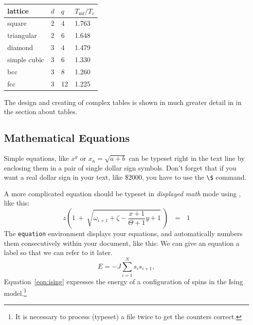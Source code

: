 \begin{table}[ht]
\centering
\small\renewcommand{\arraystretch}{1.4}  
%
\label{tab:IsingModel}
%
\begin{tabularx}{0.5\textwidth}{lXXX}
\hline
\rowcolor{tableheadcolor}
lattice & $d$ & $q$ & $T_\text{mf}/T_c$ \\
\hline
square  & 2 & 4 & 1.763 \\
%
triangular & 2 & 6 & 1.648 \\
%
diamond & 3 & 4 & 1.479 \\
%
simple cubic & 3 & 6 & 1.330 \\
%
bcc & 3 & 8 & 1.260 \\
%
fcc & 3 & 12 & 1.225 \\
\hline
\end{tabularx}
\end{table}

The design and creating of complex tables is shown in much greater detail in  in the section about tables.

\subsection{Mathematical Equations}
\label{sec:example:math}

Simple equations, like $x^y$ or $x_n = \sqrt{a + b}$ can be typeset right
in the text line by enclosing them in a pair of single dollar sign symbols.
Don't forget that if you want a real dollar sign in your text, like \$2000,
you have to use the \verb+\$+ command.

A more complicated equation should be typeset in \emph{displayed math} mode using \cs{[...}\cs{]}, like this:
%
\[
z \left( 1 \ +\  \sqrt{\omega_{i+1} + \zeta -\frac{x+1}{\Theta +1} y + 1} 
\ \right)
\ \ \ =\ \ \  1
\]
%
The \texttt{equation} environment displays your equations, and automatically
numbers them consecutively within your document, like this:
%
We can give an equation a label so that we can refer to it later.
\begin{equation}
  \label{eqn:ising}
  E = -J \sum_{i=1}^N s_i s_{i+1} ,
\end{equation}
Equation~\eqref{eqn:ising} expresses the energy of a configuration
of spins in the Ising model.\footnote{It is necessary to process (typeset) a
file twice to get the counters correct.}

